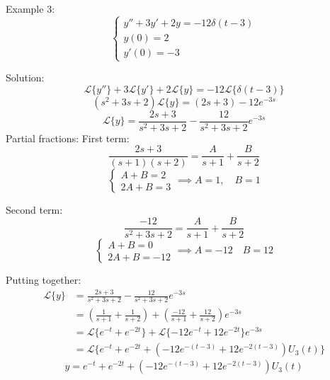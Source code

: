 \documentclass[12pt]{article}
\renewcommand{\L}[1]{\mathcal{L}\{#1\}}
\begin{document}
Example 3: 
\[\begin{cases}
    y'' + 3y' + 2y = -12\delta(t - 3)\\
    y(0) = 2\\
    y'(0) = -3
\end{cases}\]

Solution:
\[\L{y''} + 3\L{y'} + 2\L{y} = -12\L{\delta(t- 3)}\]
\[(s^2 + 3s + 2) \L{y} = (2s + 3) -12e^{-3s}\]
\[\L{y} =\frac{2s + 3}{s^2 + 3s +2} - \frac{12}{s^2 + 3s +2}e^{-3s}\]
Partial fractions:
First term: 
\[\frac{2s + 3}{(s + 1)(s + 2)} = \frac{A}{s+1} + \frac{B}{s + 2}\]
\[\begin{cases}
    A + B = 2\\
    2A + B = 3
\end{cases} \implies A = 1, \quad B = 1\]

Second term: 
\[\frac{-12}{s^2 + 3s+2} = \frac{A}{s+ 1} + \frac{B}{s+2}\]
\[\begin{cases}
    A+B = 0\\
    2A + B = -12
\end{cases} \implies A = -12 \quad B = 12\]

Putting together:
\begin{align*}
    \L{y} &= \frac{2s + 3}{s^2 + 3s +2} - \frac{12}{s^2 + 3s +2}e^{-3s}\\
    &= \left(\frac{1}{s + 1} + \frac{1}{s + 2}\right) + \left(\frac{-12}{s + 1} + \frac{12}{s + 2}\right)e^{-3s}\\
    &= \L{e^{-t} + e^{-2t}} + \L{-12e^{-t} + 12e^{-2t}}e^{-3s}\\
    &= \L{e^{-t} + e^{-2t} + (-12e^{-(t-3)} + 12e^{-2(t-3)})U_3(t)}
\end{align*}
\[\boxed{y= e^{-t} + e^{-2t} + (-12e^{-(t-3)} + 12e^{-2(t-3)})U_3(t)}\]
\end{document}
